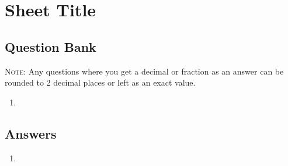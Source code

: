 \documentclass[a4paper,12pt]{article}
\begin{document}
\large
\section*{Sheet Title}

\subsection*{Question Bank}

\textsc{Note}: Any questions where you get a decimal or fraction 
as an answer can be rounded to 2 decimal places or left as 
an exact value.

\begin{enumerate}
\item {}
\end{enumerate}

\newpage
\subsection*{Answers}

\begin{enumerate}
\item 
\end{enumerate}
\end{document}
